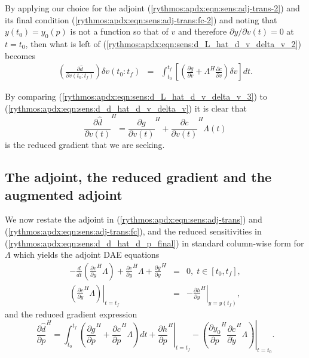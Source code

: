 \documentclass[pdf,ps2pdf,11pt]{SANDreport}
\begin{document}
%
By applying our choice for the adjoint
(\ref{rythmos:apdx:eqn:sens:adj-trans-2}) and its final condition
(\ref{rythmos:apdx:eqn:sens:adj-trans:fc-2}) and noting that $y(t_0) =
y_0(p)$ is not a function so that of $v$ and therefore $\partial y /
{}\partial v(t) = 0$ at $t=t_0$, then what is left of
(\ref{rythmos:apdx:eqn:sens:d_L_hat_d_v_delta_v_2}) becomes
%
\begin{eqnarray}
\left( \frac{\partial \hat{d}}{\partial v(t_0:t_f)} \right) \delta v(t_0:t_f)
& = & \int_{t_0}^{t_f} \left[ \left(
    \frac{\partial g}{\partial v}
    + \Lambda^H \frac{\partial c}{\partial v}
  \right) \delta v \right] dt
\label{rythmos:apdx:eqn:sens:d_L_hat_d_v_delta_v_3}.
\end{eqnarray}

By comparing (\ref{rythmos:apdx:eqn:sens:d_L_hat_d_v_delta_v_3}) to
(\ref{rythmos:apdx:eqn:sens:d_d_hat_d_v_delta_v}) it is clear that
%
\begin{equation}
\frac{\partial \hat{d}}{\partial v(t)}^H
= \frac{\partial g}{\partial v(t)}^H + \frac{\partial c}{\partial v(t)}^H \Lambda(t)
\label{rythmos:apdx:eqn:sens:d_d_hat_d_v_t}
\end{equation}
%
is the reduced gradient that we are seeking.

\subsection{The adjoint, the reduced gradient and the augmented adjoint}

We now restate the adjoint in (\ref{rythmos:apdx:eqn:sens:adj-trans}) and
(\ref{rythmos:apdx:eqn:sens:adj-trans:fc}), and the reduced sensitivities in
(\ref{rythmos:apdx:eqn:sens:d_d_hat_d_p_final}) in standard column-wise form
for $\Lambda$ which yields the adjoint DAE equations
%
\begin{eqnarray}
- \frac{d}{dt}\left( \frac{\partial c}{\partial \dot{y}}^H \Lambda \right)
+  \frac{\partial c}{\partial y}^H \Lambda + \frac{\partial g}{\partial y}^H
& = & 0, \; t \in \left[ t_0, t_f \right],
\label{rythmos:apdx:eqn:sens:adj} \\
\left.\left( \frac{\partial c}{\partial \dot{y}}^H \Lambda \right)\right|_{t=t_f}
& = & - \left. \frac{\partial h}{\partial y}^H \right|_{y=y(t_f)},
\label{rythmos:apdx:eqn:sens:adj:fc}
\end{eqnarray}
%
and the reduced gradient expression
%
\begin{equation}
\frac{\partial \hat{d}}{\partial p}^H =
\int_{t_0}^{t_f} \left(
    \frac{\partial g}{\partial p}^H
    + \frac{\partial c}{\partial p}^H \Lambda
  \right) dt
  + \left. \frac{\partial h}{\partial p}^H \right|_{t=t_f}
  - \left. \left( \frac{\partial y_0}{\partial p}^H \frac{\partial c}{\partial \dot{y}}^H \Lambda \right) \right|_{t=t_0}.
\label{rythmos:apdx:eqn:sens:d_d_hat_d_p_final-2}
\end{equation}
%
\end{document}
